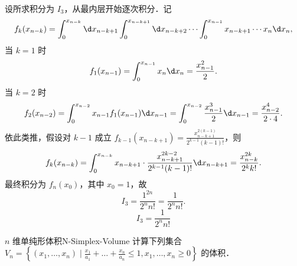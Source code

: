 \begin{solution}

    设所求积分为 $I_3$，从最内层开始逐次积分．记
    \begin{equation}
        f_k(x_{n-k}) = \int_0^{x_{n-k}} \d x_{n-k+1} \int_0^{x_{n-k+1}} \d x_{n-k+2} \cdots \int_0^{x_{n-1}} x_{n-k+1} \cdots x_n \d x_n,
    \end{equation}
    当 $k=1$ 时
    \begin{equation}
        f_1(x_{n-1}) = \int_0^{x_{n-1}} x_n \d x_n = \frac{x_{n-1}^2}{2}.
    \end{equation}
    当 $k=2$ 时
    \begin{equation}
        f_2(x_{n-2}) = \int_0^{x_{n-2}} x_{n-1} f_1(x_{n-1}) \d x_{n-1} = \int_0^{x_{n-2}} \frac{x_{n-1}^3}{2} \d x_{n-1} = \frac{x_{n-2}^4}{2 \cdot 4}.
    \end{equation}
    依此类推，假设对 $k-1$ 成立 $f_{k-1}(x_{n-k+1}) = \frac{x_{n-k+1}^{2(k-1)}}{2^{k-1} (k-1)!}$，则
    \begin{equation}
        f_k(x_{n-k}) = \int_0^{x_{n-k}} x_{n-k+1} \cdot \frac{x_{n-k+1}^{2k-2}}{2^{k-1} (k-1)!} \d x_{n-k+1} = \frac{x_{n-k}^{2k}}{2^k k!}.
    \end{equation}
    最终积分为 $f_n(x_0)$，其中 $x_0 = 1$，故
    \begin{equation}
        I_3 = \frac{1^{2n}}{2^n n!} = \frac{1}{2^n n!}.
    \end{equation}
    \begin{equation}
        \boxed{I_3 = \frac{1}{2^n n!}}
    \end{equation}
\end{solution}

\begin{problem}{$n$ 维单纯形体积}{N-Simplex-Volume}
    计算下列集合 $V_n = \left\{ (x_1, \dots, x_n) \mid \frac{x_1}{a_1} + \dots + \frac{x_n}{a_n} \le 1, x_1, \dots, x_n \ge 0 \right\}$ 的体积．
\end{problem}

